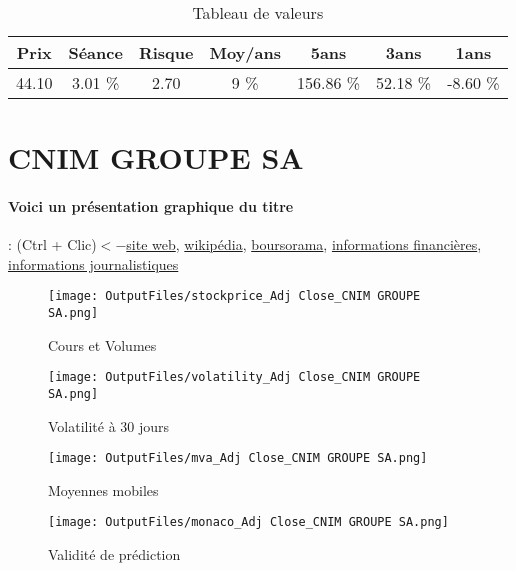 \documentclass[11pt,a4paper]{report}%
\begin{document}
\begin{table}[H]
  \centering
    \begin{tabular}{|c|c|c|c|c|c|c|}
    \hline
    Prix & Séance & Risque  & Moy/ans & 5ans & 3ans & 1ans \\
    \hline
    44.10 &    3.01 \%    & 2.70 & 9 \% & 156.86 \% & 52.18 \% & -8.60 \% \\
    \hline
    \end{tabular}%
        \label{tab:table_ALSTOM}%
      \caption{Tableau de valeurs}
\end{table}%

\newpage

\section{CNIM GROUPE SA}

\paragraph{Voici un présentation graphique du titre} : (Ctrl + Clic)$<-$\href{https://cnim.com/finance/informations-financieres}{site web}, \href{https://fr.wikipedia.org/wiki/Constructions_navales_et_industrielles_de_la_M%C3%A9diterran%C3%A9e}{wikipédia}, \href{https://www.boursorama.com/cours/1rPCOM}{boursorama}, \href{https://www.qwant.com/?q=site:https:%2f%2fwww.easybourse.com%2faction-societe%2fCNIM-GROUPE-SA&t=web&client=ext-firefox-hp}{informations financières}, \href{https://bourse.lerevenu.com/cours-de-bourse/fiche-valeur-synthese/CNIM-GROUPE-SA/COM-FR}{informations journalistiques}
\begin{figure}[!htb]
   \begin{minipage}{0.5\textwidth}
     \centering
     \texttt{[image: OutputFiles/stockprice\_Adj Close\_CNIM GROUPE SA.png]}
     \caption{Cours et Volumes}\label{Fig:price_CNIM GROUPE SA}
   \end{minipage}\hfill
   \begin{minipage}{0.5\textwidth}
     \centering
     \texttt{[image: OutputFiles/volatility\_Adj Close\_CNIM GROUPE SA.png]}
     \caption{Volatilité à 30 jours}\label{Fig:volat_CNIM GROUPE SA}
   \end{minipage}
\end{figure}
\begin{figure}[!htb]
   \begin{minipage}{0.5\textwidth}
     \centering
     \texttt{[image: OutputFiles/mva\_Adj Close\_CNIM GROUPE SA.png]}
     \caption{Moyennes mobiles}\label{Fig:mva_CNIM GROUPE SA}
   \end{minipage}\hfill
   \begin{minipage}{0.5\textwidth}
     \centering
     \texttt{[image: OutputFiles/monaco\_Adj Close\_CNIM GROUPE SA.png]}
     \caption{Validité de prédiction}\label{Fig:prediction_CNIM GROUPE SA}
   \end{minipage}
\end{figure}
\end{document}
